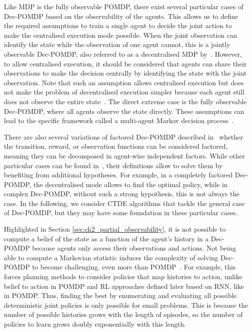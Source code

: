 Like MDP is the fully observable POMDP, there exist several particular cases of Dec-POMDP based on the observability of the agents.
This allows us to define the required assumptions to train a single agent to decide the joint action to make the centralised execution mode possible.
When the joint observation can identify the state while the observation of one agent cannot, this is a jointly observable Dec-POMDP, also referred to as a decentralised MDP by~\cite{DecPomdp}.
However, to allow centralised execution, it should be considered that agents can share their observations to make the decision centrally by identifying the state with the joint observation.
Note that such an assumption allows centralised execution but does not make the problem of decentralised execution simpler because each agent still does not observe the entire state~\citep{bernstein2002complexity}.
The direct extreme case is the fully observable Dec-POMDP, where all agents observe the state directly.
These assumptions can lead to the specific framework called a multi-agent Markov decision process~\citep{boutilier1996planning}.

There are also several variations of factored Dec-POMDP described in~\citep{DecPomdp} whether the transition, reward, or observation functions can be considered factored, meaning they can be decomposed in agent-wise independent factors.
While other particular cases can be found in~\citep{DecPomdp}, their definitions allow to solve them by benefiting from additional hypotheses.
For example, in a completely factored Dec-POMDP, the decentralised mode allows to find the optimal policy, while in complex Dec-POMDP, without such a strong hypothesis, this is not always the case.
In the following, we consider CTDE algorithms that tackle the general case of Dec-POMDP, but they may have some foundation in these particular cases.

Highlighted in Section \ref{sec:ch2_partial_observability}, it is not possible to compute a belief of the state as a function of the agent's history in a Dec-POMDP because agents only access their observations and actions.
Not being able to compute a Markovian statistic induces the complexity of solving Dec-POMDP to become challenging, even more than POMDP~\citep{DecPomdp}.
For example, this forces planning methods to consider policies that map histories to action, unlike belief to action in POMDP and RL approaches defined later based on RNN, like in POMDP.
Thus, finding the best by enumerating and evaluating all possible deterministic joint policies is only possible for small problems.
This is because the number of possible histories grows with the length of episodes, so the number of policies to learn grows doubly exponentially with this length.

